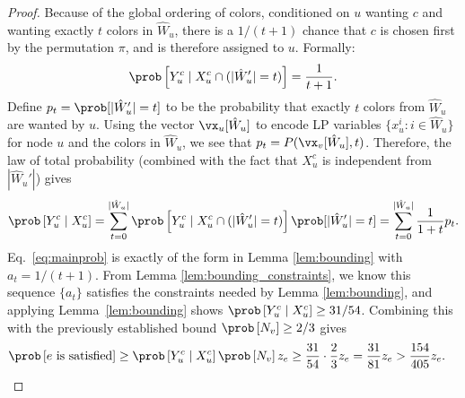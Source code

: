 \begin{proof}
	Because of the global ordering of colors, conditioned on $u$ wanting $c$ and wanting exactly $t$ colors in $\hat{W}_u$, there is a $1/(t+1)$ chance that $c$ is chosen first by the permutation $\pi$, and is therefore assigned to $u$. Formally:
	\begin{equation*}
		\prob\left[ Y_u^c \mid X_u^c  \cap (|\hat{W}'_u| = t)\right] = \frac{1}{t+1}.
	\end{equation*}
	Define $p_t = \prob[ |\hat{W}'_u| = t]$ to be the probability that exactly $t$ colors from $\hat{W}_u$ are wanted by $u$. Using the vector $\vx_u[\hat{W}_u]$ to encode LP variables $\{x_u^i \colon i \in \hat{W}_u\}$ for node $u$ and the colors in $\hat{W}_u$, we see that $p_t = P(\vx_v[\hat{W}_u], t)$. Therefore, the law of total probability (combined with the fact that $X_u^c$ is independent from $|\hat{W}_u'|$) gives
	\begin{equation}
		\label{eq:mainprob}
		\prob\left[ Y_u^c \mid X_u^c \right]
		= \sum_{t = 0}^{|\hat{W}_u|} \prob\left[ Y_u^c \mid X_u^c  \cap (|\hat{W}'_u| = t)\right] \prob[|\hat{W}'_u| = t] = \sum_{t = 0}^{|\hat{W}_u|} \frac{1}{1+t} p_t.
	\end{equation}
	Eq.~\eqref{eq:mainprob} is exactly of the form in Lemma \ref{lem:bounding} with $a_t = 1/(t+1)$. From Lemma \ref{lem:bounding_constraints}, we know this sequence $\{a_t\}$ satisfies the constraints needed by Lemma \ref{lem:bounding}, and applying Lemma~\ref{lem:bounding} shows $\prob\left[ Y_u^c \mid X_u^c \right] \geq 31/54$. Combining this with the previously established bound $\prob\left[ N_v \right] \geq 2/3$ gives
	\begin{align*}
		\prob\left[e \text{ is satisfied}\right] & \geq \prob\left[ Y_u^c \mid X_u^c \right] \prob\left[ N_v \right] z_e  \geq \frac{31}{54} \cdot \frac{2}{3} z_e = \frac{31}{81}z_e > \frac{154}{405} z_e.
	\end{align*}


	\bigbreak


\end{proof}
